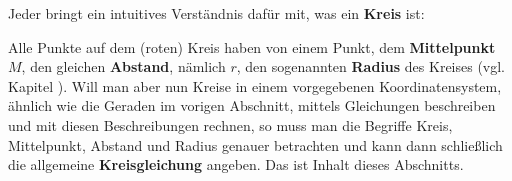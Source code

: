 \begin{MIntro}

Jeder bringt ein intuitives Verständnis dafür mit, was ein \textbf{Kreis} ist:

\begin{center}
%
\end{center}
Alle Punkte auf dem (roten) Kreis haben von einem Punkt, dem \textbf{Mittelpunkt} $M$, den gleichen \textbf{Abstand}, nämlich $r$, den sogenannten \textbf{Radius} des Kreises (vgl. Kapitel ). Will man aber nun Kreise in einem vorgegebenen Koordinatensystem, ähnlich wie die Geraden im vorigen Abschnitt, mittels Gleichungen beschreiben und mit diesen Beschreibungen rechnen, so muss man die Begriffe Kreis, Mittelpunkt, Abstand und Radius genauer betrachten und kann dann schließlich die allgemeine \textbf{Kreisgleichung} angeben. Das ist Inhalt dieses Abschnitts.  


\end{MIntro}

